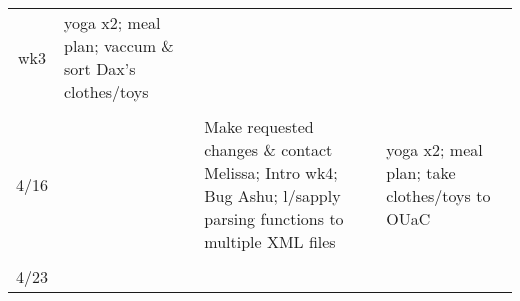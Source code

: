 \documentclass[]{article}
\begin{document}
\begin{longtable}[]{@{}clll@{}}
\begin{minipage}[t]{0.33\columnwidth}
wk3\strut
\end{minipage} & \begin{minipage}[t]{0.28\columnwidth}\raggedright\strut
yoga x2; meal plan; vaccum \& sort Dax's clothes/toys\strut
\end{minipage}\tabularnewline
\begin{minipage}[t]{0.04\columnwidth}\centering\strut
\strut
\end{minipage} & \begin{minipage}[t]{0.24\columnwidth}\raggedright\strut
\strut
\end{minipage} & \begin{minipage}[t]{0.33\columnwidth}\raggedright\strut
\strut
\end{minipage} & \begin{minipage}[t]{0.28\columnwidth}\raggedright\strut
\strut
\end{minipage}\tabularnewline
\begin{minipage}[t]{0.04\columnwidth}\centering\strut
4/16\strut
\end{minipage} & \begin{minipage}[t]{0.24\columnwidth}\raggedright\strut
\strut
\end{minipage} & \begin{minipage}[t]{0.33\columnwidth}\raggedright\strut
Make requested changes \& contact Melissa; Intro wk4; Bug Ashu; l/sapply
parsing functions to multiple XML files\strut
\end{minipage} & \begin{minipage}[t]{0.28\columnwidth}\raggedright\strut
yoga x2; meal plan; take clothes/toys to OUaC\strut
\end{minipage}\tabularnewline
\begin{minipage}[t]{0.04\columnwidth}\centering\strut
\strut
\end{minipage} & \begin{minipage}[t]{0.24\columnwidth}\raggedright\strut
\strut
\end{minipage} & \begin{minipage}[t]{0.33\columnwidth}\raggedright\strut
\strut
\end{minipage} & \begin{minipage}[t]{0.28\columnwidth}\raggedright\strut
\strut
\end{minipage}\tabularnewline
\begin{minipage}[t]{0.04\columnwidth}\centering\strut
4/23\strut
\end{minipage} & \begin{minipage}[t]{0.24\columnwidth}\raggedright\strut

\end{minipage}
\end{longtable}
\end{document}
